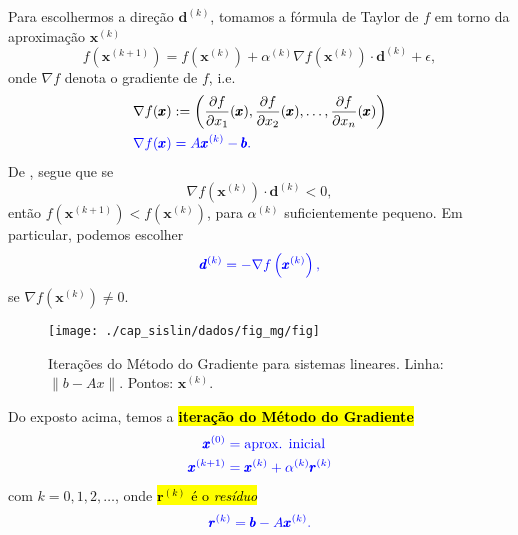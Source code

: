 Para escolhermos a direção $\pmb{d}^{(k)}$, tomamos a fórmula de Taylor de $f$ em torno da aproximação $\pmb{x}^{(k)}$
\begin{equation}\label{cap_sislin_sec_metg:eq:metg_taylor}
  f\left(\pmb{x}^{(k+1)}\right) = f\left(\pmb{x}^{(k)}\right) + \alpha^{(k)}\nabla f\left(\pmb{x}^{(k)}\right)\cdot \pmb{d}^{(k)} + \epsilon,
\end{equation}
onde $\nabla f$ denota o gradiente de $f$, i.e.
\begin{align}
  \nabla f(\pmb{x}) &:= \left(\frac{\partial f}{\partial x_1}(\pmb{x}), \frac{\partial f}{\partial x_2}(\pmb{x}), \dotsc, \frac{\partial f}{\partial x_n}(\pmb{x})\right)\\
  \color{blue}\nabla f(\pmb{x}) &\color{blue}= A\pmb{x}^{(k)}-\pmb{b}.
\end{align}
De \label{cap_sislin_sec_metg:eq:metg_taylor}, segue que se
\begin{equation}
  \nabla f\left(\pmb{x}^{(k)}\right)\cdot \pmb{d}^{(k)} < 0,
\end{equation}
então $f\left(\pmb{x}^{(k+1)}\right) < f\left(\pmb{x}^{(k)}\right)$, para $\alpha^{(k)}$ suficientemente pequeno. Em particular, podemos escolher
\begin{equation}\color{blue}\pmb{d}^{(k)} = -\nabla f\left(\pmb{x}^{(k)}\right),
\end{equation}
se $\nabla f(\pmb{x}^{(k)})\neq 0$.


\begin{figure}[H]
  \centering
  \texttt{[image: ./cap\_sislin/dados/fig\_mg/fig]}
  \caption{Iterações do Método do Gradiente para sistemas lineares. Linha: $\|b-Ax\|$. Pontos: $\pmb{x}^{(k)}$.}
  \label{cap_sislin_sec_metg:fig:cap_sislin_sec_mg}
\end{figure}

Do exposto acima, temos a \hl{\textbf{iteração do Método do Gradiente}}
\begin{equation}\color{blue}\begin{aligned}
    \pmb{x}^{(0)} &= \text{aprox. inicial}\\
    \pmb{x}^{(k+1)} &= \pmb{x}^{(k)} + \alpha^{(k)}\pmb{r}^{(k)}
  \end{aligned}
\end{equation}
com $k = 0, 1, 2, \ldots$, onde \hl{$\pmb{r}^{(k)}$ é o \emph{resíduo}}
\begin{equation}\color{blue}\pmb{r}^{(k)} = \pmb{b} - A\pmb{x}^{(k)}.
\end{equation}

